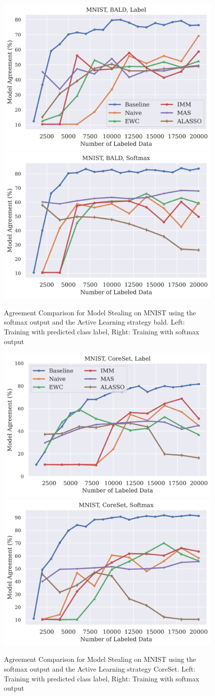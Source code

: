 \begin{figure}[!htb]
    \centering
    \includegraphics[width=0.48\linewidth]{images/results_CALMS/mnist_label_bald.png} \hfill
    \includegraphics[width=0.48\linewidth]{images/results_CALMS/mnist_softmax_bald.png}
    \caption{Agreement Comparison for Model Stealing on MNIST using the softmax output and the Active Learning strategy \gls{bald}. Left: Training with predicted class label,
    Right: Training with softmax output}
    \label{fig:CALMSMNISTBALD}
\end{figure}

\begin{figure}[!htb]
    \centering
    \includegraphics[width=0.48\linewidth]{images/results_CALMS/mnist_label_coreset.png} \hfill
    \includegraphics[width=0.48\linewidth]{images/results_CALMS/mnist_softmax_coreset.png}
    \caption{Agreement Comparison for Model Stealing on MNIST using the softmax output and the Active Learning strategy CoreSet. Left: Training with predicted class label,
    Right: Training with softmax output}
    \label{fig:CALMSMNISTCoreSet}
\end{figure}

